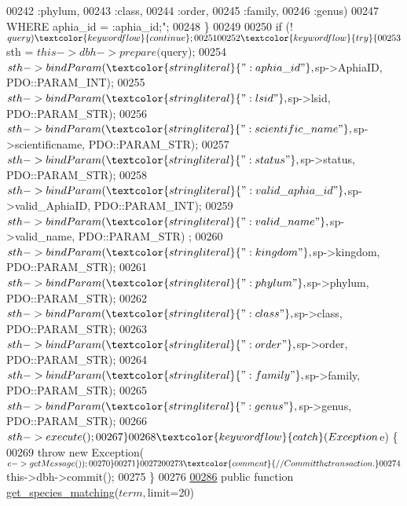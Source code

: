 \begin{DoxyCode}
{00242 \textcolor{stringliteral}{                        :phylum,}
00243 \textcolor{stringliteral}{                        :class,}
00244 \textcolor{stringliteral}{                        :order,}
00245 \textcolor{stringliteral}{                        :family,}
00246 \textcolor{stringliteral}{                        :genus)}
00247 \textcolor{stringliteral}{                    WHERE aphia\_id = :aphia\_id;"};
00248             \}
00249 
00250             \textcolor{keywordflow}{if} (!$query) \textcolor{keywordflow}{continue};
00251 
00252             \textcolor{keywordflow}{try} \{
00253                 $sth = $this->dbh->prepare($query);
00254                 $sth->bindParam(\textcolor{stringliteral}{":aphia\_id"}, $sp->AphiaID, PDO::PARAM\_INT);
00255                 $sth->bindParam(\textcolor{stringliteral}{":lsid"}, $sp->lsid, PDO::PARAM\_STR);
00256                 $sth->bindParam(\textcolor{stringliteral}{":scientific\_name"}, $sp->scientificname, 
      PDO::PARAM\_STR);
00257                 $sth->bindParam(\textcolor{stringliteral}{":status"}, $sp->status, PDO::PARAM\_STR);
00258                 $sth->bindParam(\textcolor{stringliteral}{":valid\_aphia\_id"}, $sp->valid\_AphiaID, 
      PDO::PARAM\_INT);
00259                 $sth->bindParam(\textcolor{stringliteral}{":valid\_name"}, $sp->valid\_name, PDO::PARAM\_STR)
      ;
00260                 $sth->bindParam(\textcolor{stringliteral}{":kingdom"}, $sp->kingdom, PDO::PARAM\_STR);
00261                 $sth->bindParam(\textcolor{stringliteral}{":phylum"}, $sp->phylum, PDO::PARAM\_STR);
00262                 $sth->bindParam(\textcolor{stringliteral}{":class"}, $sp->class, PDO::PARAM\_STR);
00263                 $sth->bindParam(\textcolor{stringliteral}{":order"}, $sp->order, PDO::PARAM\_STR);
00264                 $sth->bindParam(\textcolor{stringliteral}{":family"}, $sp->family, PDO::PARAM\_STR);
00265                 $sth->bindParam(\textcolor{stringliteral}{":genus"}, $sp->genus, PDO::PARAM\_STR);
00266                 $sth->execute();
00267             \}
00268             \textcolor{keywordflow}{catch} (Exception $e) \{
00269                 \textcolor{keywordflow}{throw} \textcolor{keyword}{new} Exception( $e->getMessage() );
00270             \}
00271         \}
00272 
00273         \textcolor{comment}{// Commit the transaction.}
00274         $this->dbh->commit();
00275     \}
00276 
\hypertarget{Database_8php_source_l00286}{}\hyperlink{classDatabase_a5972a2838b98ed0b7816a528ac823bec}{00286}     \textcolor{keyword}{public} \textcolor{keyword}{function} \hyperlink{classDatabase_a5972a2838b98ed0b7816a528ac823bec}{get\_species\_matching}($term, $limit=20) 
}
\end{DoxyCode}
